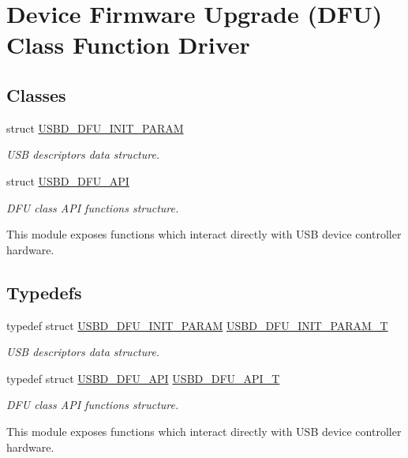 \hypertarget{group___u_s_b_d___d_f_u}{}\section{Device Firmware Upgrade (D\+FU) Class Function Driver}
\label{group___u_s_b_d___d_f_u}
\subsection*{Classes}
\begin{DoxyCompactItemize}
\item 
struct \hyperlink{struct_u_s_b_d___d_f_u___i_n_i_t___p_a_r_a_m}{U\+S\+B\+D\+\_\+\+D\+F\+U\+\_\+\+I\+N\+I\+T\+\_\+\+P\+A\+R\+AM}
\begin{DoxyCompactList}\small\item\em U\+SB descriptors data structure. \end{DoxyCompactList}\item 
struct \hyperlink{struct_u_s_b_d___d_f_u___a_p_i}{U\+S\+B\+D\+\_\+\+D\+F\+U\+\_\+\+A\+PI}
\begin{DoxyCompactList}\small\item\em D\+FU class A\+PI functions structure.

This module exposes functions which interact directly with U\+SB device controller hardware. \end{DoxyCompactList}\end{DoxyCompactItemize}
\subsection*{Typedefs}
\begin{DoxyCompactItemize}
\item 
typedef struct \hyperlink{struct_u_s_b_d___d_f_u___i_n_i_t___p_a_r_a_m}{U\+S\+B\+D\+\_\+\+D\+F\+U\+\_\+\+I\+N\+I\+T\+\_\+\+P\+A\+R\+AM} \hyperlink{group___u_s_b_d___d_f_u_ga8506b43ae2bda83cc8c459114fd3fc82}{U\+S\+B\+D\+\_\+\+D\+F\+U\+\_\+\+I\+N\+I\+T\+\_\+\+P\+A\+R\+A\+M\+\_\+T}
\begin{DoxyCompactList}\small\item\em U\+SB descriptors data structure. \end{DoxyCompactList}\item 
typedef struct \hyperlink{struct_u_s_b_d___d_f_u___a_p_i}{U\+S\+B\+D\+\_\+\+D\+F\+U\+\_\+\+A\+PI} \hyperlink{group___u_s_b_d___d_f_u_gadf9281f8af1223053e3ccf48e26ac80d}{U\+S\+B\+D\+\_\+\+D\+F\+U\+\_\+\+A\+P\+I\+\_\+T}
\begin{DoxyCompactList}\small\item\em D\+FU class A\+PI functions structure.

This module exposes functions which interact directly with U\+SB device controller hardware. \end{DoxyCompactList}\end{DoxyCompactItemize}


